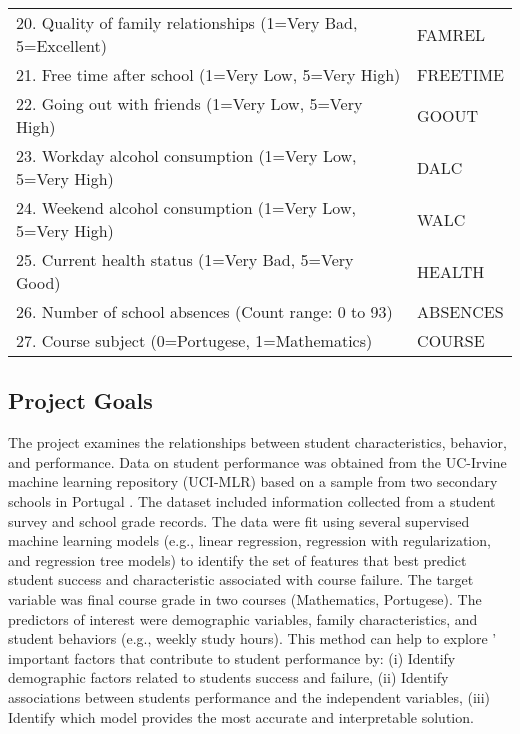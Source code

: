 \documentclass[sigconf]{acmart}
\begin{document}
\begin{table*}[ht]
\begin{tabular}{ll}
    20. Quality of family relationships (1=Very Bad, 5=Excellent) & FAMREL  \\
    21. Free time after school (1=Very Low, 5=Very High) & FREETIME  \\
    22. Going out with friends (1=Very Low, 5=Very High) & GOOUT  \\
    23. Workday alcohol consumption (1=Very Low, 5=Very High) & DALC  \\
    24. Weekend alcohol consumption (1=Very Low, 5=Very High) & WALC  \\
    25. Current health status (1=Very Bad, 5=Very Good) & HEALTH  \\ 
    26. Number of school absences (Count range: 0 to 93) & ABSENCES  \\
    27. Course subject (0=Portugese, 1=Mathematics) & COURSE  \\
    \bottomrule
  \end{tabular}
\end{table*}


\subsection{Project Goals} 

The project examines the relationships between student characteristics,  
behavior, and performance. Data on student performance was obtained from the 
UC-Irvine machine learning repository (UCI-MLR) based on a sample from two 
secondary schools in Portugal \cite{cortez09}. The dataset included 
information collected from a student survey and school grade records. The 
data were fit using several supervised machine learning models (e.g., linear 
regression, regression with regularization, and regression tree models) 
to identify the set of features that best predict student success and 
characteristic associated with course failure. The target variable was final 
course grade in two courses (Mathematics, Portugese). The predictors of
interest were demographic variables, family characteristics, and student 
behaviors (e.g., weekly study hours). This method can help to explore '
important factors that contribute to student performance by: (i) Identify 
demographic factors related to students success and failure, (ii) Identify
associations between students performance and the independent variables, (iii)
Identify which model provides the most accurate and interpretable solution. 
\end{document}
